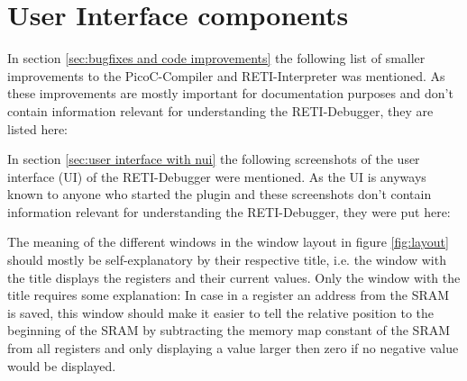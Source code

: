 \documentclass{report}
\begin{document}
\section{User Interface components}
\label{sec:user interface components}

In section \ref{sec:bugfixes and code improvements} the following list of smaller improvements to the PicoC-Compiler and RETI-Interpreter was mentioned. As these improvements are mostly important for documentation purposes and don't contain information relevant for understanding the RETI-Debugger, they are listed here:

In section \ref{sec:user interface with nui} the following screenshots of the user interface (\alert{UI}) of the RETI-Debugger were mentioned. As the UI is anyways known to anyone who started the plugin and these screenshots don't contain information relevant for understanding the RETI-Debugger, they were put here:

The meaning of the different windows in the window layout in figure \ref{fig:layout} should mostly be self-explanatory by their respective title, i.e. the window with the title  displays the registers and their current values. Only the window with the title  requires some explanation: In case in a register an address from the SRAM is saved, this window should make it easier to tell the relative position to the beginning of the SRAM by subtracting the memory map constant of the SRAM from all registers and only displaying a value larger then zero if no negative value would be displayed.
\end{document}
